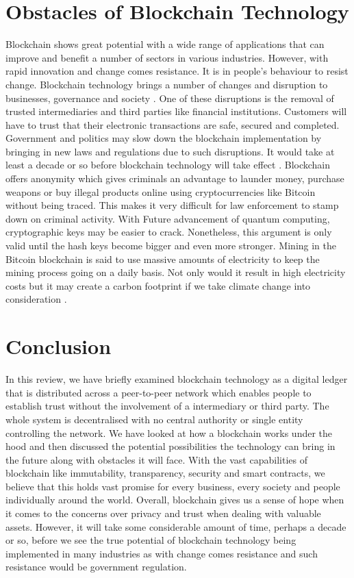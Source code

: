 \documentclass[report]{IEEEtran}
\begin{document}
\section{Obstacles of Blockchain Technology}
Blockchain shows great potential with a wide range of applications that can improve and benefit a number of sectors in various industries. However, with rapid innovation and change comes resistance. It is in people's behaviour to resist change. Blockchain technology brings a number of changes and disruption to businesses, governance and society \cite{survey}. One of these disruptions is the removal of trusted intermediaries and third parties like financial institutions. Customers will have to trust that their electronic transactions are safe, secured and completed. Government and politics may slow down the blockchain implementation by bringing in new laws and regulations due to such disruptions. It would take at least a decade or so before blockchain technology will take effect \cite{time}. Blockchain offers anonymity which gives criminals an advantage to launder money, purchase weapons or buy illegal products online using cryptocurrencies like Bitcoin without being traced. This makes it very difficult for law enforcement to stamp down on criminal activity. With Future advancement of quantum computing, cryptographic keys may be easier to crack. Nonetheless, this argument is only valid until the hash keys become bigger and even more stronger. Mining in the Bitcoin blockchain is said to use massive amounts of electricity to keep the mining process going on a daily basis. Not only would it result in high electricity costs but it may create a carbon footprint if we take climate change into consideration \cite{double}.

\section{Conclusion}
In this review, we have briefly examined blockchain technology as a digital ledger that is distributed across a peer-to-peer network which enables people to establish trust without the involvement of a intermediary or third party. The whole system is decentralised with no central authority or single entity controlling the network. We have looked at how a blockchain works under the hood and then discussed the potential possibilities the technology can bring in the future along with obstacles it will face. With the vast capabilities of blockchain like immutability, transparency, security and smart contracts, we believe that this holds vast promise for every business, every society and people individually around the world. Overall, blockchain gives us a sense of hope when it comes to the concerns over privacy and trust when dealing with valuable assets. However, it will take some considerable amount of time, perhaps a decade or so, before we see the true potential of blockchain technology being implemented in many industries as with change comes resistance and such resistance would be government regulation. 



\end{document}
